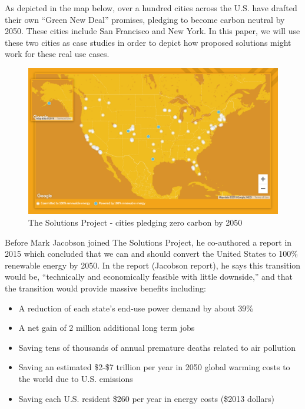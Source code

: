 \documentclass[hidelinks,12pt,a4paper]{article}
\begin{document}
As depicted in the map below, over a hundred cities across the U.S. have drafted their own “Green New Deal” promises, pledging to become carbon neutral by 2050. These cities include San Francisco \cite{SFNetZeroBy2050} and New York. \cite{ActionOnGlobalWarmingNYCsGreenNewDeal} In this paper, we will use these two cities as case studies in order to depict how proposed solutions might work for these real use cases.

\begin{figure}[ht!]
    \centering
    \includegraphics[width=1\textwidth]{over-100-cities-go-100-green.png}
    \caption{The Solutions Project - cities pledging zero carbon by 2050 \cite{TheSolutionsProject2018ImpactReport}}
\end{figure}
\FloatBarrier


Before Mark Jacobson joined The Solutions Project, he co-authored a report in 2015 which concluded that we can and should convert the United States to 100\% renewable energy by 2050. In the report (Jacobson report), he says this transition would be, “technically and economically feasible with little downside,” \cite{100PercCleanAndRenewableEnergyBy2050} and that the transition would provide massive benefits including: \cite{100PercCleanAndRenewableEnergyBy2050}

{\footnotesize
\begin{itemize}
    \item A reduction of each state’s end-use power demand by about 39\%
    \item A net gain of 2 million additional long term jobs
    \item Saving tens of thousands of annual premature deaths related to air pollution
    \item Saving an estimated \$2-\$7 trillion per year in 2050 global warming costs to the world due to U.S. emissions
    \item Saving each U.S. resident \$260 per year in energy costs (\$2013 dollars)
\end{itemize}
}
\end{document}
